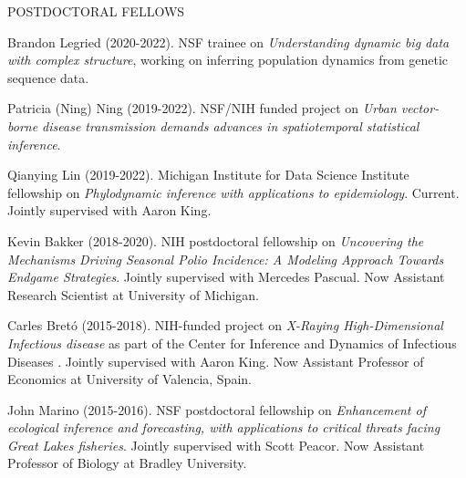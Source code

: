 \begin{reflist}{POSTDOCTORAL FELLOWS}

\item{Brandon Legried } (2020-2022). NSF trainee on {\it Understanding dynamic big data with complex structure}, working on inferring population dynamics from genetic sequence data.
  
\item{Patricia (Ning) Ning } (2019-2022). NSF/NIH funded project on {\it Urban vector-borne disease transmission demands advances in spatiotemporal statistical inference}.

\item{Qianying Lin } (2019-2022). Michigan Institute for Data Science Institute fellowship on {\it Phylodynamic inference with applications to epidemiology}. Current. Jointly supervised with Aaron King.
  
\item{Kevin Bakker} (2018-2020). NIH postdoctoral fellowship on {\it Uncovering the Mechanisms Driving Seasonal Polio Incidence: A Modeling Approach Towards Endgame Strategies}. Jointly supervised with Mercedes Pascual. Now Assistant Research Scientist at University of Michigan.

\item{Carles Bret\'{o}} (2015-2018). NIH-funded project on {\it X-Raying High-Dimensional Infectious disease} as part of the Center for Inference and Dynamics of Infectious Diseases .  Jointly supervised with Aaron King. Now Assistant Professor of Economics at University of Valencia, Spain.

\item{John Marino} (2015-2016). NSF postdoctoral fellowship on {\it Enhancement of ecological inference and forecasting, with applications to critical threats facing Great Lakes fisheries}. Jointly supervised with Scott Peacor. Now Assistant Professor of Biology at Bradley University.
  
\end{reflist}

\lsp

